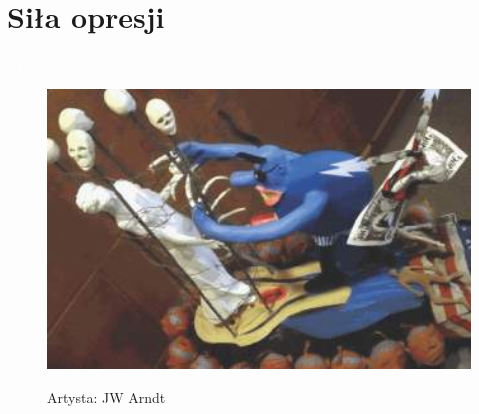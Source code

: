 \chapter{Siła opresji}
\begin{flushright}
\vfill\textcolor{white}{Artist: Mohammed Fayaz}
\end{flushright}

\newpage
\begin{figure}[h]
\centering
\includegraphics[width=16cm]{TeX_files/2-1.png}
\label{2-1}
\begin{flushright}
Artysta: JW Arndt
\end{flushright}
\end{figure}


